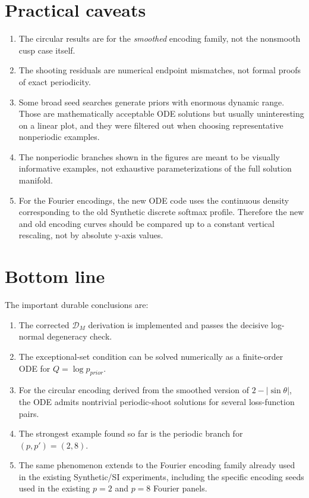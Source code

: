 \documentclass[11pt]{article}
\newcommand{\Prior}{p_{prior}}
\begin{document}
\section{Practical caveats}

\begin{enumerate}
\item The circular results are for the \emph{smoothed} encoding family, not the nonsmooth cusp case itself.
\item The shooting residuals are numerical endpoint mismatches, not formal proofs of exact periodicity.
\item Some broad seed searches generate priors with enormous dynamic range. Those are mathematically acceptable ODE solutions but usually uninteresting on a linear plot, and they were filtered out when choosing representative nonperiodic examples.
\item The nonperiodic branches shown in the figures are meant to be visually informative examples, not exhaustive parameterizations of the full solution manifold.
\item For the Fourier encodings, the new ODE code uses the continuous density corresponding to the old Synthetic discrete softmax profile. Therefore the new and old encoding curves should be compared up to a constant vertical rescaling, not by absolute y-axis values.
\end{enumerate}

\section{Bottom line}

The important durable conclusions are:
\begin{enumerate}
\item The corrected $\mathcal{D}_M$ derivation is implemented and passes the decisive log-normal degeneracy check.
\item The exceptional-set condition can be solved numerically as a finite-order ODE for $Q=\log \Prior$.
\item For the circular encoding derived from the smoothed version of $2-|\sin\theta|$, the ODE admits nontrivial periodic-shoot solutions for several loss-function pairs.
\item The strongest example found so far is the periodic branch for $(p,p')=(2,8)$.
\item The same phenomenon extends to the Fourier encoding family already used in the existing Synthetic/SI experiments, including the specific encoding seeds used in the existing $p=2$ and $p=8$ Fourier panels.
\end{enumerate}
\end{document}
